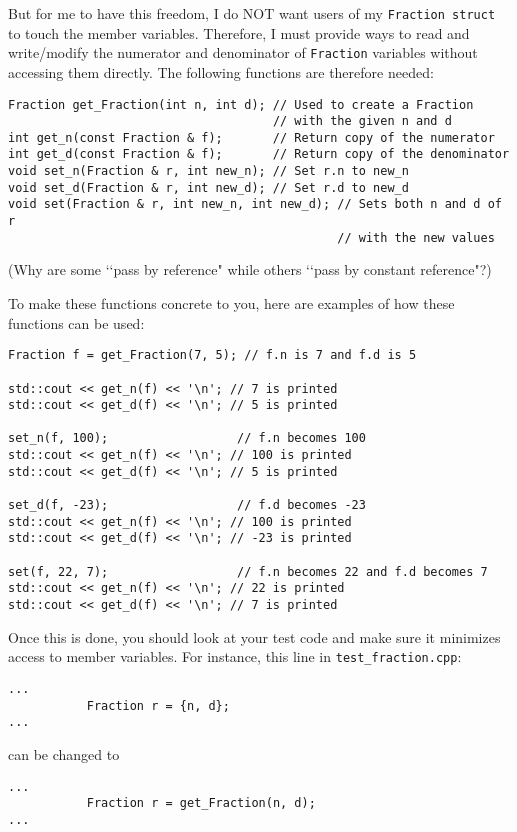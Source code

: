 But for me to have this freedom, I do NOT want users of my
\verb!Fraction struct! to touch the member variables. Therefore, I must provide
ways to read and write/modify the numerator and denominator of \verb!Fraction!
variables without accessing them directly. The following functions are
therefore needed:
\begin{Verbatim}[frame=single]
Fraction get_Fraction(int n, int d); // Used to create a Fraction
                                     // with the given n and d
int get_n(const Fraction & f);       // Return copy of the numerator
int get_d(const Fraction & f);       // Return copy of the denominator
void set_n(Fraction & r, int new_n); // Set r.n to new_n
void set_d(Fraction & r, int new_d); // Set r.d to new_d
void set(Fraction & r, int new_n, int new_d); // Sets both n and d of r
                                              // with the new values
\end{Verbatim}

(Why are some \lq\lq pass by reference" while others \lq\lq pass by constant
reference"?)

To make these functions concrete to you, here are examples of how these
functions can be used:
\begin{Verbatim}[frame=single]
Fraction f = get_Fraction(7, 5); // f.n is 7 and f.d is 5

std::cout << get_n(f) << '\n'; // 7 is printed
std::cout << get_d(f) << '\n'; // 5 is printed

set_n(f, 100);                  // f.n becomes 100
std::cout << get_n(f) << '\n'; // 100 is printed
std::cout << get_d(f) << '\n'; // 5 is printed

set_d(f, -23);                  // f.d becomes -23
std::cout << get_n(f) << '\n'; // 100 is printed
std::cout << get_d(f) << '\n'; // -23 is printed

set(f, 22, 7);                  // f.n becomes 22 and f.d becomes 7
std::cout << get_n(f) << '\n'; // 22 is printed
std::cout << get_d(f) << '\n'; // 7 is printed
\end{Verbatim}

Once this is done, you should look at your test code and make sure it minimizes
access to member variables. For instance, this line in
\verb!test_fraction.cpp!:
\begin{Verbatim}[frame=single]
...
           Fraction r = {n, d};
...
\end{Verbatim}
can be changed to
\begin{Verbatim}[frame=single]
...
           Fraction r = get_Fraction(n, d);
...
\end{Verbatim}

